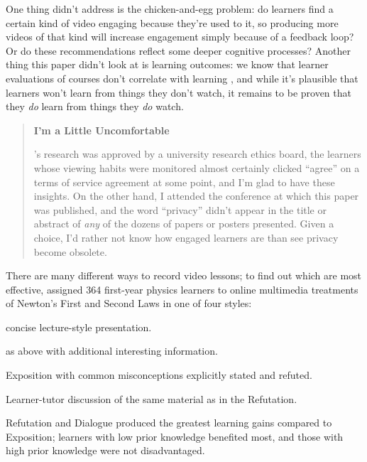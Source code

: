 One thing \cite{Guo2014} didn't address is the chicken-and-egg
problem: do learners find a certain kind of video engaging because
they're used to it, so producing more videos of that kind will
increase engagement simply because of a feedback loop? Or do these
recommendations reflect some deeper cognitive processes? Another thing
this paper didn't look at is learning outcomes: we know that learner
evaluations of courses don't correlate with learning
\cite{Star2014,Uttl2017}, and while it's plausible that
learners won't learn from things they don't watch, it remains to be
proven that they \emph{do} learn from things they \emph{do} watch.

\begin{quote}\setlength{\parindent}{0pt}
\textbf{I'm a Little Uncomfortable}

\cite{Guo2014}'s research was approved by a university research
ethics board, the learners whose viewing habits were monitored almost
certainly clicked ``agree'' on a terms of service agreement at some
point, and I'm glad to have these insights. On the other hand, I
attended the conference at which this paper was published, and the
word ``privacy'' didn't appear in the title or abstract of \emph{any} of the
dozens of papers or posters presented. Given a choice, I'd rather not
know how engaged learners are than see privacy become obsolete.
\end{quote}

There are many different ways to record video lessons; to find out which
are most effective, \cite{Mull2007a} assigned 364 first-year physics
learners to online multimedia treatments of Newton's First and Second
Laws in one of four styles:

\begin{description}
\tightlist
\item[Exposition:]
concise lecture-style presentation.
\item[Extended Exposition:]
as above with additional interesting information.
\item[Refutation:]
Exposition with common misconceptions explicitly stated and refuted.
\item[Dialog:]
Learner-tutor discussion of the same material as in the Refutation.
\end{description}

Refutation and Dialogue produced the greatest learning gains compared to
Exposition; learners with low prior knowledge benefited most, and those
with high prior knowledge were not disadvantaged.

